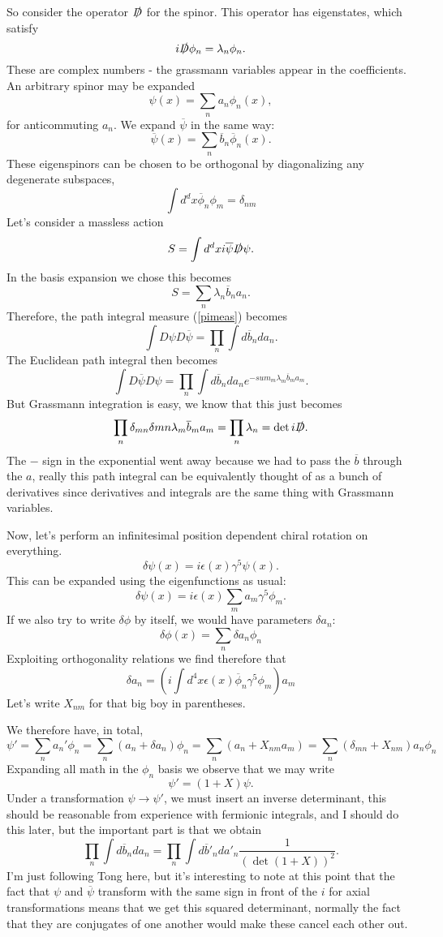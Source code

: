 \documentclass[main.tex]{subfiles}
\begin{document}
So consider the operator $\slashed{D}$ for the spinor. This operator has eigenstates, which satisfy
\[
i \slashed{D} \phi_n = \lambda_n \phi_n.
\]
These are complex numbers - the grassmann variables appear in the coefficients. An arbitrary spinor may be expanded
\[
\psi (x) = \sum_n a_n \phi_n (x),
\]
for anticommuting $a_n$. We expand $\overline{\psi}$ in the same way:
\[
\overline{\psi} (x) = \sum_n \overline{b}_n \overline{\phi}_n (x).
\]
These eigenspinors can be chosen to be orthogonal by diagonalizing any degenerate subspaces,
\[
\int d^d x \overline{\phi}_n \phi_m = \delta_{nm}
\]
Let's consider a massless action
\[
S = \int d^d x i \overline{\psi} \slashed{D} \psi.
\]
In the basis expansion we chose this becomes
\[
S = \sum_n \lambda_n \overline{b}_n a_n.
\]
Therefore, the path integral measure (\ref{pimeas}) becomes
\[
\int D \psi D \overline{\psi} = \prod_n \int d\overline{b}_n da_n.
\]
The Euclidean path integral then becomes
\[
\int D \overline{\psi} D \psi = \prod_n \int d\overline{b}_n da_n e^{-sum_m \lambda_m \overline{b}_m a_m}.
\]
But Grassmann integration is easy, we know that this just becomes
\[
\prod_n \delta_{mn} \delta{mn} \lambda_m \overline{b}_m a_m = \prod_n \lambda_n = \det i \slashed{D}.
\]
The $-$ sign in the exponential went away because we had to pass the $\overline{b}$ through the $a$, really this path integral can be equivalently thought of as a bunch of derivatives since derivatives and integrals are the same thing with Grassmann variables.

Now, let's perform an infinitesimal position dependent chiral rotation on everything.
\[
\delta \psi (x) = i \epsilon (x) \gamma^5 \psi (x).
\]
This can be expanded using the eigenfunctions as usual:
\[
\delta \psi (x) = i \epsilon(x) \sum_m a_m \gamma^5 \phi_m.
\]
If we also try to write $\delta \phi$ by itself, we would have parameters $\delta a_n$:
\[
\delta \phi (x) = \sum_n \delta a_n \phi_n
\]
Exploiting orthogonality relations we find therefore that 
\[
\delta a_n = \left( 
i \int d^4 x \epsilon (x) \overline{\phi}_n \gamma^5 \phi_m
\right) a_m
\]
Let's write $X_{nm}$ for that big boy in parentheses.

We therefore have, in total,
\[
\psi' = \sum_n a_n' \phi_n = \sum_n \left( a_n + \delta a_n \right)\phi_n = \sum_n \left( a_n + X_{nm} a_m \right) = \sum_n \left( \delta_{mn} + X_{nm} \right) a_n \phi_n
\]
Expanding all math in the $\phi_n$ basis we observe that we may write
\[
\psi' = (1 + X) \psi.
\]
Under a transformation $\psi \to \psi'$, we must insert an inverse determinant, this should be reasonable from experience with fermionic integrals, and I should do this later, but the important part is that we obtain
\[
\prod_n \int d\overline{b}_n da_n = \prod_n  \int d\overline{b}'_n da'_n \frac{1}{(\det (1 + X))^2}.
\]
I'm just following Tong here, but it's interesting to note at this point that the fact that $\psi$ and $\overline{\psi}$ transform with the same sign in front of the $i$ for axial transformations means that we get this squared determinant, normally the fact that they are conjugates of one another would make these cancel each other out.
\end{document}
